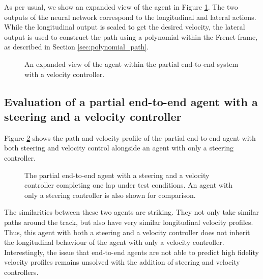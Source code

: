 As per usual, we show an expanded view of the agent in Figure \ref{fig:steer_vel_agent}.
The two outputs of the neural network correspond to the longitudinal and lateral actions.
While the longitudinal output is scaled to get the desired velocity, the lateral output is used to construct the path using a polynomial within the Frenet frame, as described in Section \ref{sec:polynomial_path}.

\begin{figure}[htb!]
    \centering
    
    \caption[An expanded view of the agent within the partial end-to-end system with a velocity controller]{An expanded view of the agent within the partial end-to-end system with a velocity controller.}
    \label{fig:steer_vel_agent}
\end{figure}


\subsection{Evaluation of a partial end-to-end agent with a steering and a velocity controller}

Figure \ref{fig:steer_velocity_lap} shows the path and velocity profile of the partial end-to-end agent with both steering and velocity control alongside an agent with only a steering controller.
\begin{figure}[htb!]
    \centering
    
    \caption[The partial end-to-end agent with a steering and a velocity controller completing one lap under test conditions]{The partial end-to-end agent with a steering and a velocity controller completing one lap under test conditions. An agent with only a steering controller is also shown for comparison.}
    \label{fig:steer_velocity_lap}
\end{figure}
The similarities between these two agents are striking.
They not only take similar paths around the track, but also have very similar longitudinal velocity profiles.
Thus, this agent with both a steering and a velocity controller does not inherit the longitudinal behaviour of the agent with only a velocity controller.
Interestingly, the issue that end-to-end agents are not able to predict high fidelity velocity profiles remains unsolved with the addition of steering and velocity controllers.


